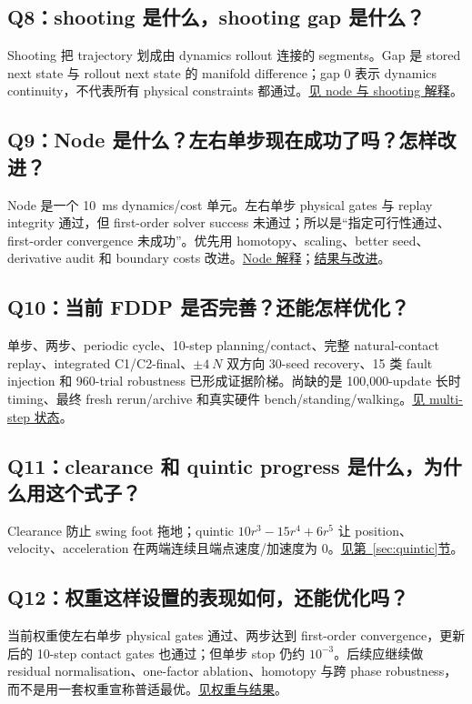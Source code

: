 \documentclass[UTF8,11pt,a4paper]{ctexart}
\begin{document}
\subsection{Q8：shooting 是什么，shooting gap 是什么？}\label{q8}
Shooting 把 trajectory 划成由 dynamics rollout 连接的 segments。Gap 是 stored next state 与 rollout next state 的 manifold difference；gap 0 表示 dynamics continuity，不代表所有 physical constraints 都通过。\hyperref[sec:node]{见 node 与 shooting 解释}。

\subsection{Q9：Node 是什么？左右单步现在成功了吗？怎样改进？}\label{q9}
Node 是一个 \SI{10}{\milli\second} dynamics/cost 单元。左右单步 physical gates 与 replay integrity 通过，但 first-order solver success 未通过；所以是“指定可行性通过、first-order convergence 未成功”。优先用 homotopy、scaling、better seed、derivative audit 和 boundary costs 改进。\hyperref[sec:node]{Node 解释}；\hyperref[sec:weights_results]{结果与改进}。

\subsection{Q10：当前 FDDP 是否完善？还能怎样优化？}\label{q10}
单步、两步、periodic cycle、10-step planning/contact、完整 natural-contact replay、integrated C1/C2-final、$\pm\SI{4}{N}$ 双方向 30-seed recovery、15 类 fault injection 和 960-trial robustness 已形成证据阶梯。尚缺的是 100,000-update 长时 timing、最终 fresh rerun/archive 和真实硬件 bench/standing/walking。\hyperref[sec:multistep]{见 multi-step 状态}。

\subsection{Q11：clearance 和 quintic progress 是什么，为什么用这个式子？}\label{q11}
Clearance 防止 swing foot 拖地；quintic $10r^3-15r^4+6r^5$ 让 position、velocity、acceleration 在两端连续且端点速度/加速度为 0。\hyperref[sec:quintic]{见第~\ref*{sec:quintic}节}。

\subsection{Q12：权重这样设置的表现如何，还能优化吗？}\label{q12}
当前权重使左右单步 physical gates 通过、两步达到 first-order convergence，更新后的 10-step contact gates 也通过；但单步 stop 仍约 $10^{-3}$。后续应继续做 residual normalisation、one-factor ablation、homotopy 与跨 phase robustness，而不是用一套权重宣称普适最优。\hyperref[sec:weights_results]{见权重与结果}。
\end{document}
